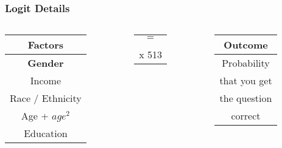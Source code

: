 \documentclass[pdf]{beamer}
\begin{document}
\begin{frame}
\label{logit_details}
\frametitle{Logit Details}
  \begin{columns}
    \begin{column}{0.25\textwidth}
       \begin{tabular}{c}  %
         \hline   %
         Factors          \\
         \hline   %
         \textbf{Gender}           \\
         Income           \\
         Race / Ethnicity \\
         Age + $age^2$    \\
         Education        \\
         \hline  %
         \end{tabular}
    \end{column}

    \begin{column}{0.05\textwidth}
      \begin{tabular}{c}
        \LARGE{$ = $} \\
        \\
        x 513
      \end{tabular}
    \end{column}

    \begin{column}{0.2\textwidth}
       \begin{tabular}{c}  %
         \hline   %
         Outcome        \\
         \hline   %
         Probability      \\
         that you get     \\
         the question     \\
         correct          \\
         \hline  %
      \end{tabular}
    \end{column}
  \end{columns}


\end{frame}
\end{document}
